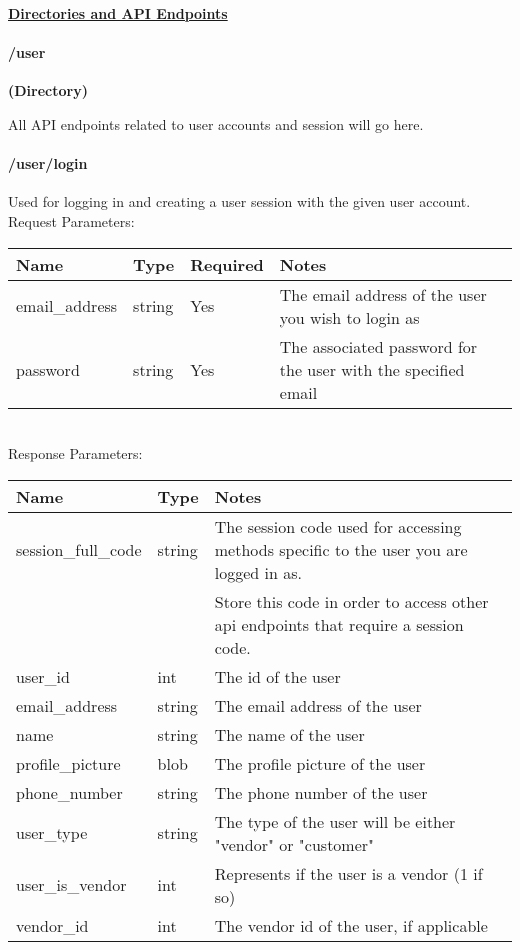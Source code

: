 \documentclass{article}[11pt]
\begin{document}
\noindent
\textbf{\underline{Directories and API Endpoints}} \\

\paragraph{/user}\textbf{ (Directory) }

All API endpoints related to user accounts and session will go here.


\paragraph{/user/login}\textbf{}

Used for logging in and creating a user session with the given user account. \\

\noindent
Request Parameters:

\noindent
\begin{tabular}{|l|l|l|l|}
\hline
\textbf{Name} & \textbf{Type} & \textbf{Required} & \textbf{Notes} \\
\hline
email\_address & string & Yes & The email address of the user you wish to login as \\
\hline
password & string & Yes & The associated password for the user with the specified email \\
\hline
\end{tabular} \\

\noindent
Response Parameters:

\noindent
\begin{tabular}{|l|l|l|}
\hline
\textbf{Name} & \textbf{Type} & \textbf{Notes} \\
\hline
session\_full\_code & string & The session code used for accessing methods specific to the user you are logged in as. \\
& & Store this code in order to access other api endpoints that require a session code. \\
user\_id & int & The id of the user \\
email\_address & string & The email address of the user \\
name & string & The name of the user \\
profile\_picture & blob & The profile picture of the user \\
phone\_number & string & The phone number of the user \\
user\_type & string & The type of the user will be either "vendor" or "customer" \\
user\_is\_vendor & int & Represents if the user is a vendor (1 if so) \\
vendor\_id & int & The vendor id of the user, if applicable \\
\hline
\end{tabular} \\
\end{document}
